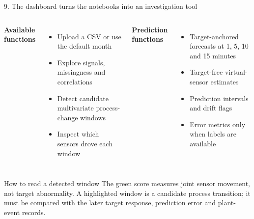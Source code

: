 \documentclass[10pt,aspectratio=169]{beamer}
\begin{document}
\begin{frame}{9. The dashboard turns the notebooks into an investigation tool}
  \begin{columns}[T,onlytextwidth]
      \textbf{Available functions}
      \begin{itemize}
        \item Upload a CSV or use the default month
        \item Explore signals, missingness and correlations
        \item Detect candidate multivariate process-change windows
        \item Inspect which sensors drove each window
      \end{itemize}
      \textbf{Prediction functions}
      \begin{itemize}
        \item Target-anchored forecasts at 1, 5, 10 and 15 minutes
        \item Target-free virtual-sensor estimates
        \item Prediction intervals and drift flags
        \item Error metrics only when labels are available
      \end{itemize}
  \end{columns}

  \vspace{0.25cm}
  \begin{block}{How to read a detected window}
    The green score measures joint sensor movement, not target abnormality. A highlighted window is a candidate process transition; it must be compared with the later target response, prediction error and plant-event records.
  \end{block}
\end{frame}
\end{document}
